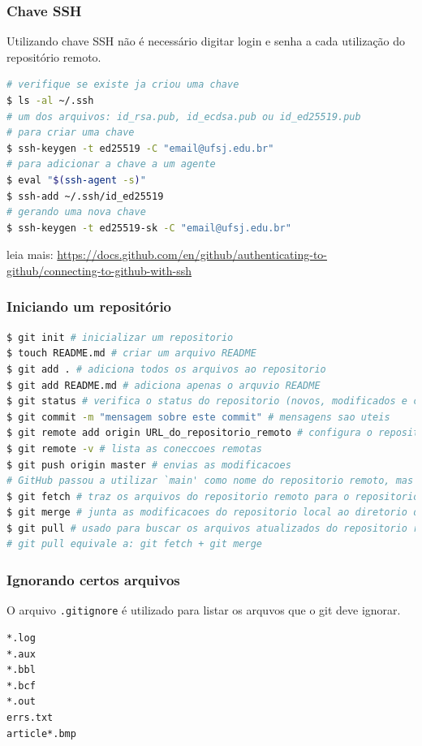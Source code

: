 \begin{frame}[fragile]
\frametitle{Chave SSH}
Utilizando chave SSH não é necessário digitar login e senha a cada utilização do repositório remoto.
\begin{lstlisting}[language=bash, label=lst-git-ssh, caption={Utilização de chave SSH.}, postbreak=\mbox{$\hookrightarrow$\space}, basicstyle=\fontsize{8}{10}\selectfont\ttfamily]
# verifique se existe ja criou uma chave
$ ls -al ~/.ssh
# um dos arquivos: id_rsa.pub, id_ecdsa.pub ou id_ed25519.pub
# para criar uma chave
$ ssh-keygen -t ed25519 -C "email@ufsj.edu.br"
# para adicionar a chave a um agente
$ eval "$(ssh-agent -s)"
$ ssh-add ~/.ssh/id_ed25519
# gerando uma nova chave
$ ssh-keygen -t ed25519-sk -C "email@ufsj.edu.br"
\end{lstlisting}

leia mais:
\url{https://docs.github.com/en/github/authenticating-to-github/connecting-to-github-with-ssh}
\end{frame}


\begin{frame}
\frametitle{Iniciando um repositório}
\begin{lstlisting}[language=bash, label=lst-git-init, caption={Inicializando um repositório.}, postbreak=\mbox{$\hookrightarrow$\space}, basicstyle=\fontsize{8}{10}\selectfont\ttfamily]
$ git init # inicializar um repositorio
$ touch README.md # criar um arquivo README
$ git add . # adiciona todos os arquivos ao repositorio
$ git add README.md # adiciona apenas o arquvio README
$ git status # verifica o status do repositorio (novos, modificados e commited)
$ git commit -m "mensagem sobre este commit" # mensagens sao uteis
$ git remote add origin URL_do_repositorio_remoto # configura o repositorio remoto
$ git remote -v # lista as coneccoes remotas
$ git push origin master # envias as modificacoes 
# GitHub passou a utilizar `main' como nome do repositorio remoto, mas podemos trocar
$ git fetch # traz os arquivos do repositorio remoto para o repositorio local
$ git merge # junta as modificacoes do repositorio local ao diretorio de trabalho
$ git pull # usado para buscar os arquivos atualizados do repositorio remoto
# git pull equivale a: git fetch + git merge
\end{lstlisting}
\end{frame}

\begin{frame}[fragile]
\frametitle{Ignorando certos arquivos}
O arquivo \texttt{.gitignore} é utilizado para listar os arquvos que o git deve ignorar.

\begin{lstlisting}[language=bash, label=lst-git-ignore, caption={Exemplo de arquivo \texttt{.gitignore}.}, postbreak=\mbox{$\hookrightarrow$\space}, basicstyle=\fontsize{8}{10}\selectfont\ttfamily]
*.log
*.aux
*.bbl
*.bcf
*.out
errs.txt
article*.bmp
\end{lstlisting}
\end{frame}

